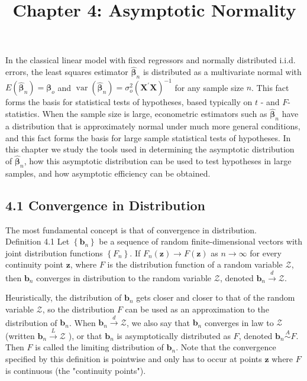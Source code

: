 \documentclass[10pt]{article}
\title{Chapter 4: Asymptotic Normality}
\author{}
\date{}
\begin{document}
\maketitle

In the classical linear model with fixed regressors and normally distributed i.i.d. errors, the least squares estimator $\hat{\boldsymbol{\beta}}_{n}$ is distributed as a multivariate normal with $E\left(\hat{\boldsymbol{\beta}}_{n}\right)=\boldsymbol{\beta}_{o}$ and $\operatorname{var}\left(\hat{\boldsymbol{\beta}}_{n}\right)=\sigma_{o}^{2}\left(\mathbf{X}^{\prime} \mathbf{X}\right)^{-1}$ for any sample size $n$. This fact forms the basis for statistical tests of hypotheses, based typically on $t$ - and $F$-statistics. When the sample size is large, econometric estimators such as $\hat{\boldsymbol{\beta}}_{n}$ have a distribution that is approximately normal under much more general conditions, and this fact forms the basis for large sample statistical tests of hypotheses. In this chapter we study the tools used in determining the asymptotic distribution of $\hat{\boldsymbol{\beta}}_{n}$, how this asymptotic distribution can be used to test hypotheses in large samples, and how asymptotic efficiency can be obtained.

\subsection*{4.1 Convergence in Distribution}
The most fundamental concept is that of convergence in distribution.\\
Definition 4.1 Let $\left\{\mathbf{b}_{n}\right\}$ be a sequence of random finite-dimensional vectors with joint distribution functions $\left\{F_{n}\right\}$. If $F_{n}(\mathbf{z}) \rightarrow F(\mathbf{z})$ as $n \rightarrow \infty$ for every continuity point $\mathbf{z}$, where $F$ is the distribution function of a random variable $\mathcal{Z}$, then $\mathbf{b}_{n}$ converges in distribution to the random variable $\mathcal{Z}$, denoted $\mathbf{b}_{n} \xrightarrow{d} \mathcal{Z}$.

Heuristically, the distribution of $\mathbf{b}_{n}$ gets closer and closer to that of the random variable $\mathcal{Z}$, so the distribution $F$ can be used as an approximation to the distribution of $\mathbf{b}_{n}$. When $\mathbf{b}_{n} \xrightarrow{d} \mathcal{Z}$, we also say that $\mathbf{b}_{n}$ converges in law to $\mathcal{Z}$ (written $\mathbf{b}_{n} \xrightarrow{L} \mathcal{Z}$ ), or that $\mathbf{b}_{n}$ is asymptotically distributed as $F$, denoted $\mathbf{b}_{n} \stackrel{A}{\sim} F$. Then $F$ is called the limiting distribution of $\mathbf{b}_{n}$. Note that the convergence specified by this definition is pointwise and only has to occur at points $\mathbf{z}$ where $F$ is continuous (the "continuity points").
\end{document}
